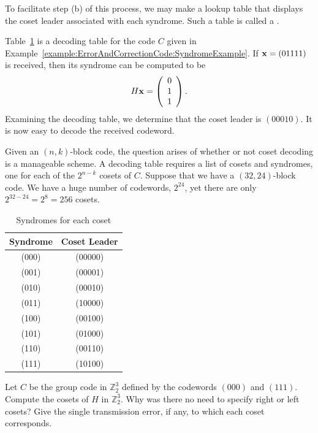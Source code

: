 To facilitate step (b) of this process, we may make a lookup table that displays the coset leader associated
with each syndrome. Such a table is called a . 
 
\begin{example}{}
Table~\ref{table:ErrorAndCorrectionCode:DecodingTable} is a decoding table for the code $C$ given in Example~\ref{example:ErrorAndCorrectionCode:SyndromeExample}. If
${\bold x} = (01111)$ is received, then its syndrome can be computed
to be
\[
H {\bold x} =
\left(
\begin{array}{c}
0 \\
1 \\
1
\end{array}
\right).
\]
Examining the decoding table, we determine that the coset leader is
$(00010)$. It is now easy to decode the received codeword. 
\end{example} 
 
Given an $(n,k)$-block code, the question arises of whether or not
coset decoding is a manageable scheme.  A decoding table requires a
list of cosets and syndromes, one for each of the $2^{n-k}$ cosets of
$C$.  Suppose that we have a $(32, 24)$-block code.  We have a huge
number of codewords, $2^{24}$, yet there are only $2^{32-24} = 2^{8} =
256$ cosets.  
 
\begin{table}[htb]
\caption{Syndromes for each coset \label{table:ErrorAndCorrectionCode:DecodingTable}}{\small
\begin{center}
\begin{tabular}{|c|c|}
\hline
Syndrome & Coset Leader \\
\hline
(000) & (00000) \\
(001) & (00001) \\
(010) & (00010) \\
(011) & (10000) \\
(100) & (00100) \\
(101) & (01000) \\
(110) & (00110) \\
(111) & (10100) \\
\hline
\end{tabular}
\end{center}
}
\end{table}
 
 
\begin{exercise}{}
Let $C$ be the group code in $\mathbb{Z}_2^3$ defined by the codewords
$(000)$ and $(111)$. Compute the cosets of $H$ in $\mathbb{Z}_2^3$. Why
was there no need to specify right or left cosets? Give the
single transmission error, if any, to which each coset corresponds.
 \end{exercise}
 
